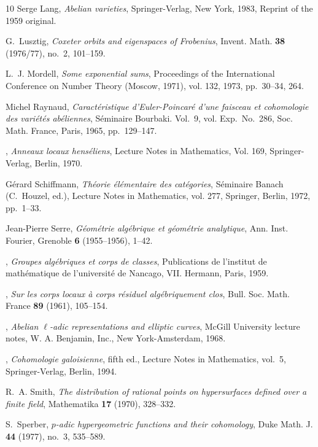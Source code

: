\documentclass[12pt,oneside,english]{smfbook}
\begin{document}
\begin{thebibliography}{10}
 Serge Lang, \emph{Abelian varieties}, Springer-Verlag, New York, 1983, Reprint of the 1959 original. 

 G.~Lusztig, \emph{Coxeter orbits and eigenspaces of {F}robenius}, Invent. Math. \textbf{38} (1976/77), no.~2, 101--159.

 L.~J. Mordell, \emph{Some exponential sums}, Proceedings of the {I}nternational {C}onference on {N}umber {T}heory ({M}oscow, 1971), vol. 132, 1973, pp.~30--34, 264.

 Michel Raynaud, \emph{Caract\'eristique d'{E}uler-{P}oincar\'e d'une faisceau et cohomologie des vari\'et\'es ab\'eliennes}, S\'eminaire {B}ourbaki. {V}ol.\ 9, vol. Exp.\ No.\ 286, Soc. Math. France, Paris, 1965, pp.~129--147.

 \bysame, \emph{Anneaux locaux hens\'eliens}, Lecture Notes in Mathematics, Vol. 169, Springer-Verlag, Berlin, 1970. 

 G\'erard Schiffmann, \emph{Th\'eorie \'el\'ementaire des cat\'egories}, S\'eminaire Banach (C.~Houzel, ed.), Lecture Notes in Mathematics, vol. 277, Springer, Berlin, 1972, pp.~1--33.

 Jean-Pierre Serre, \emph{G\'eom\'etrie alg\'ebrique et g\'eom\'etrie analytique}, Ann. Inst. Fourier, Grenoble \textbf{6} (1955--1956), 1--42. 

 \bysame, \emph{Groupes alg\'ebriques et corps de classes}, Publications de l'institut de math\'ematique de l'universit\'e de Nancago, VII. Hermann, Paris, 1959. 

 \bysame, \emph{Sur les corps locaux \`a corps r\'esiduel alg\'ebriquement clos}, Bull. Soc. Math. France \textbf{89} (1961), 105--154.

 \bysame, \emph{Abelian {$\ell$}-adic representations and elliptic curves}, McGill University lecture notes, W. A. Benjamin, Inc., New York-Amsterdam, 1968.

 \bysame, \emph{Cohomologie galoisienne}, fifth ed., Lecture Notes in Mathematics, vol.~5, Springer-Verlag, Berlin, 1994. 

 R.~A. Smith, \emph{The distribution of rational points on hypersurfaces defined over a finite field}, Mathematika \textbf{17} (1970), 328--332.

 S.~Sperber, \emph{{$p$}-adic hypergeometric functions and their cohomology}, Duke Math. J. \textbf{44} (1977), no.~3, 535--589.


\end{thebibliography}
\end{document}
